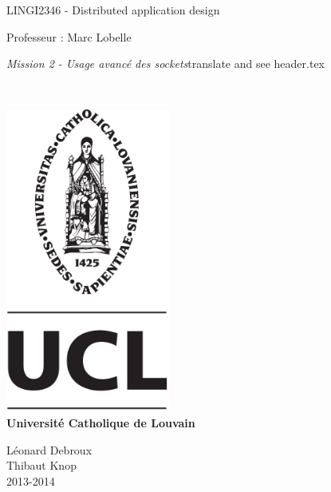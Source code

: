 \documentclass{article}
\begin{document}
\begin{titlepage}
    \begin{center}
        {\huge LINGI2346 - Distributed application design}\\
        \vspace{0.4cm}
        
        {\Large {Professeur : Marc Lobelle}}\\
        \vspace{0.6cm}
        
        {\Large \textit{Mission 2 - Usage avancé des sockets}{\Large translate and see header.tex}}\\
        \vspace{1.2cm}

        \texttt{}\\
        \vspace{0.2cm}

        \includegraphics[height=10cm]{pageGarde.png}\\
        \vspace{0.1cm}
        {\Large \textbf{Universit\'e Catholique de Louvain}}
        \vspace{0.7cm}

        \vspace{2cm}
        
        Léonard Debroux\\
        Thibaut Knop\\
        \vspace{0.2cm}
        2013-2014\\
    \end{center}
\end{titlepage}
\end{document}
